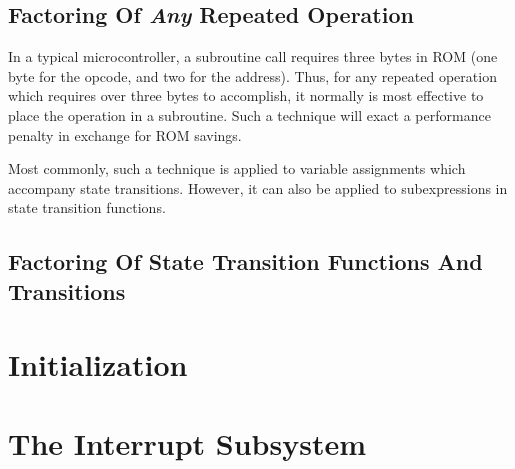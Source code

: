 \subsection{Factoring Of \emph{Any} Repeated Operation}
\label{cpco0:srrs0:sfar0}

In a typical microcontroller, a subroutine call requires three bytes in ROM
(one byte for the opcode, and two for the address).  Thus, for any
repeated operation which requires over three bytes to accomplish,
it normally is most effective to place the operation in a subroutine.
Such a technique will exact a performance penalty in exchange for
ROM savings.

Most commonly, such a technique is applied to variable assignments which
accompany state transitions.  However, it can also be applied
to subexpressions in state transition functions.


\subsection{Factoring Of State Transition Functions And Transitions}
\label{cpco0:srrs0:sfst0}



\section{Initialization}



\section{The Interrupt Subsystem}



